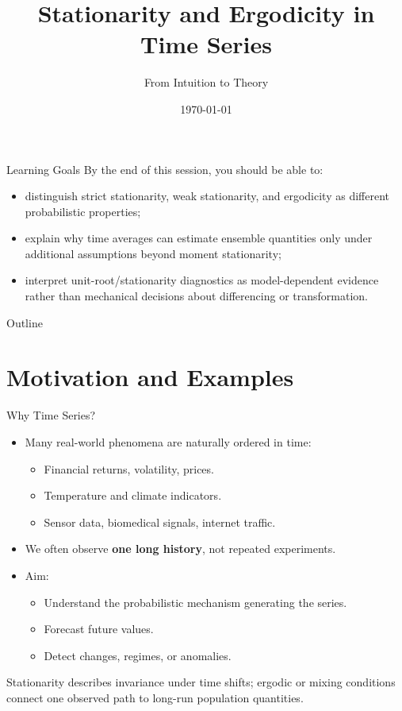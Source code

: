 \documentclass{beamer}
\title[Stationarity \& Ergodicity]{Stationarity and Ergodicity in Time Series}
\subtitle{From Intuition to Theory}
\date{\today}
\begin{document}

\begin{frame}
  \titlepage
\end{frame}

\begin{frame}{Learning Goals}
  By the end of this session, you should be able to:
  \begin{itemize}
    \item distinguish strict stationarity, weak stationarity, and ergodicity as different probabilistic properties;
    \item explain why time averages can estimate ensemble quantities only under additional assumptions beyond moment stationarity;
    \item interpret unit-root/stationarity diagnostics as model-dependent evidence rather than mechanical decisions about differencing or transformation.
  \end{itemize}
\end{frame}

\begin{frame}{Outline}
  \tableofcontents
\end{frame}

\section{Motivation and Examples}

\begin{frame}{Why Time Series?}
  \begin{itemize}
    \item Many real-world phenomena are naturally ordered in time:
      \begin{itemize}
        \item Financial returns, volatility, prices.
        \item Temperature and climate indicators.
        \item Sensor data, biomedical signals, internet traffic.
      \end{itemize}
    \item We often observe \textbf{one long history}, not repeated experiments.
    \item Aim:
      \begin{itemize}
        \item Understand the probabilistic mechanism generating the series.
        \item Forecast future values.
        \item Detect changes, regimes, or anomalies.
      \end{itemize}
  \end{itemize}

  \vspace{0.3cm}
  Stationarity describes invariance under time shifts; ergodic or mixing conditions connect one observed path to long-run population quantities.
\end{frame}
\end{document}
